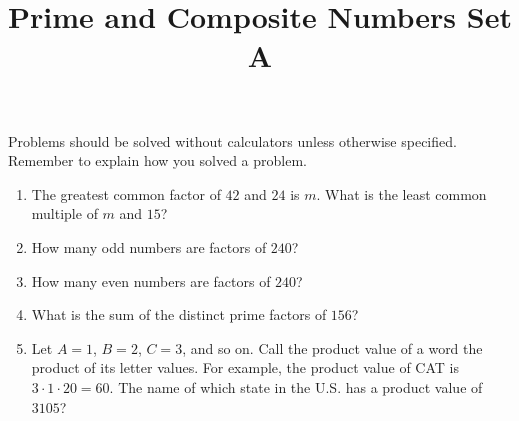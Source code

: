 \documentclass[twocolumn]{article}
\title{Prime and Composite Numbers Set A}
\date{}
\author{}
\begin{document}
\maketitle
\noindent Problems should be solved without calculators unless otherwise
specified. Remember to explain how you solved a problem.
\begin{enumerate}
    \item The greatest common factor of $42$ and $24$ is $m$. What is the least
        common multiple of $m$ and $15$?
        \vspace{3cm}
    \item How many odd numbers are factors of $240$?
        \vspace{3cm}
    \item How many even numbers are factors of $240$?
        \vspace{3cm}
    \item What is the sum of the distinct prime factors of $156$?
        \vspace{3cm}
    \item Let $A = 1$, $B = 2$, $C = 3$, and so on. Call the product value of a word
        the product of its letter values. For example, the product value of CAT is
        $3 \cdot 1 \cdot 20 = 60$. The name of which state in the U.S. has a product
        value of $3105$?
        \vspace{3cm}
\end{enumerate}
\end{document}
